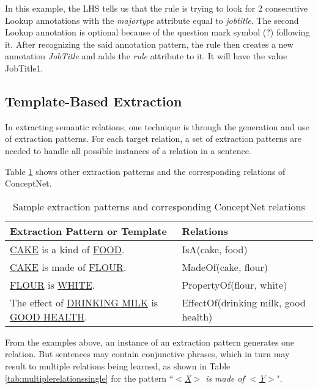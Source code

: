 In this example, the LHS tells us that the rule is trying to look for 2 consecutive Lookup annotations with the \textit{majortype} attribute equal to \textit{jobtitle}. The second Lookup annotation is optional because of the question mark symbol (?) following it. After recognizing the said annotation pattern, the rule then creates a new annotation \textit{JobTitle} and adds the \textit{rule} attribute to it. It will have the value JobTitle1.

\subsection{Template-Based Extraction}
\label{sec:relextraction}

In extracting semantic relations, one technique is through the generation and use of extraction patterns. For each target relation, a set of extraction patterns are needed to handle all possible instances of a relation in a sentence.

Table \ref{tab:patternsamples} shows other extraction patterns and the corresponding relations of ConceptNet.

\begin{table}[ht]   %
\centering
\caption{Sample extraction patterns and corresponding ConceptNet relations} \vspace{0.25em}
\begin{tabular}{|p{7cm}|l|} \hline
Extraction Pattern or Template & Relations \\ \hline
\underline{CAKE} is a kind of \underline{FOOD}. & IsA(cake, food) \\ \hline
\underline{CAKE} is made of \underline{FLOUR}. & MadeOf(cake, flour) \\ \hline
\underline{FLOUR} is \underline{WHITE}. & PropertyOf(flour, white) \\ \hline
The effect of \underline{DRINKING MILK} is \underline{GOOD HEALTH}. & EffectOf(drinking milk, good health) \\ \hline
\end{tabular}
\label{tab:patternsamples}
\end{table}

From the examples above, an instance of an extraction pattern generates one relation. But sentences may contain conjunctive phrases, which in turn may result to multiple relations being learned, as shown in Table \ref{tab:multiplerelationssingle} for the pattern ``\textit{\underline{$<$X$>$} is made of \underline{$<$Y$>$}}".

